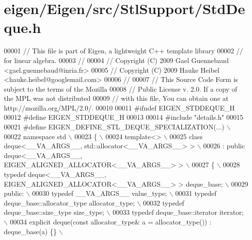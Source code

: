 \hypertarget{eigen_2_eigen_2src_2_stl_support_2_std_deque_8h_source}{}\section{eigen/\+Eigen/src/\+Stl\+Support/\+Std\+Deque.h}
\label{eigen_2_eigen_2src_2_stl_support_2_std_deque_8h_source}

\begin{DoxyCode}
00001 \textcolor{comment}{// This file is part of Eigen, a lightweight C++ template library}
00002 \textcolor{comment}{// for linear algebra.}
00003 \textcolor{comment}{//}
00004 \textcolor{comment}{// Copyright (C) 2009 Gael Guennebaud <gael.guennebaud@inria.fr>}
00005 \textcolor{comment}{// Copyright (C) 2009 Hauke Heibel <hauke.heibel@googlemail.com>}
00006 \textcolor{comment}{//}
00007 \textcolor{comment}{// This Source Code Form is subject to the terms of the Mozilla}
00008 \textcolor{comment}{// Public License v. 2.0. If a copy of the MPL was not distributed}
00009 \textcolor{comment}{// with this file, You can obtain one at http://mozilla.org/MPL/2.0/.}
00010 
00011 \textcolor{preprocessor}{#ifndef EIGEN\_STDDEQUE\_H}
00012 \textcolor{preprocessor}{#define EIGEN\_STDDEQUE\_H}
00013 
00014 \textcolor{preprocessor}{#include "details.h"}
00015 
00021 \textcolor{preprocessor}{#define EIGEN\_DEFINE\_STL\_DEQUE\_SPECIALIZATION(...) \(\backslash\)}
00022 \textcolor{preprocessor}{namespace std \(\backslash\)}
00023 \textcolor{preprocessor}{\{ \(\backslash\)}
00024 \textcolor{preprocessor}{  template<> \(\backslash\)}
00025 \textcolor{preprocessor}{  class deque<\_\_VA\_ARGS\_\_, std::allocator<\_\_VA\_ARGS\_\_> >           \(\backslash\)}
00026 \textcolor{preprocessor}{    : public deque<\_\_VA\_ARGS\_\_, EIGEN\_ALIGNED\_ALLOCATOR<\_\_VA\_ARGS\_\_> > \(\backslash\)}
00027 \textcolor{preprocessor}{  \{ \(\backslash\)}
00028 \textcolor{preprocessor}{    typedef deque<\_\_VA\_ARGS\_\_, EIGEN\_ALIGNED\_ALLOCATOR<\_\_VA\_ARGS\_\_> > deque\_base; \(\backslash\)}
00029 \textcolor{preprocessor}{  public: \(\backslash\)}
00030 \textcolor{preprocessor}{    typedef \_\_VA\_ARGS\_\_ value\_type; \(\backslash\)}
00031 \textcolor{preprocessor}{    typedef deque\_base::allocator\_type allocator\_type; \(\backslash\)}
00032 \textcolor{preprocessor}{    typedef deque\_base::size\_type size\_type;  \(\backslash\)}
00033 \textcolor{preprocessor}{    typedef deque\_base::iterator iterator;  \(\backslash\)}
00034 \textcolor{preprocessor}{    explicit deque(const allocator\_type& a = allocator\_type()) : deque\_base(a) \{\}  \(\backslash\)}

\end{DoxyCode}
